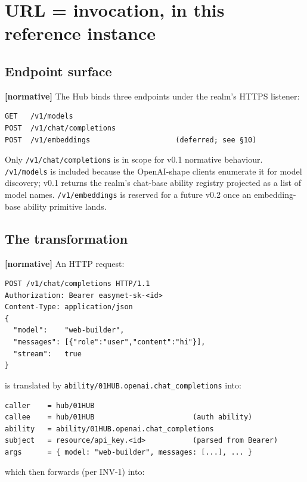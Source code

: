 \documentclass[11pt,a4paper]{article}
\newcommand{\normsv}{\textcolor{normativecolor}{\textbf{[normative]}}\xspace}
\theoremstyle{definition}
\begin{document}
\section{URL = invocation, in this reference instance}
\label{sec:url}

\subsection{Endpoint surface}

\normsv{} The Hub binds three endpoints under the realm's HTTPS
listener:

\begin{lstlisting}
GET   /v1/models
POST  /v1/chat/completions
POST  /v1/embeddings                    (deferred; see §10)
\end{lstlisting}

Only \texttt{/v1/chat/completions} is in scope for v0.1 normative
behaviour. \texttt{/v1/models} is included because the
OpenAI-shape clients enumerate it for model discovery; v0.1
returns the realm's chat-base ability registry projected as a
list of model names. \texttt{/v1/embeddings} is reserved for a
future v0.2 once an embedding-base ability primitive lands.

\subsection{The transformation}

\normsv{} An HTTP request:

\begin{lstlisting}
POST /v1/chat/completions HTTP/1.1
Authorization: Bearer easynet-sk-<id>
Content-Type: application/json
{
  "model":    "web-builder",
  "messages": [{"role":"user","content":"hi"}],
  "stream":   true
}
\end{lstlisting}

is translated by \texttt{ability/01HUB.openai.chat\_completions} into:

\begin{lstlisting}
caller    = hub/01HUB
callee    = hub/01HUB                       (auth ability)
ability   = ability/01HUB.openai.chat_completions
subject   = resource/api_key.<id>           (parsed from Bearer)
args      = { model: "web-builder", messages: [...], ... }
\end{lstlisting}

which then forwards (per INV-1) into:
\end{document}
